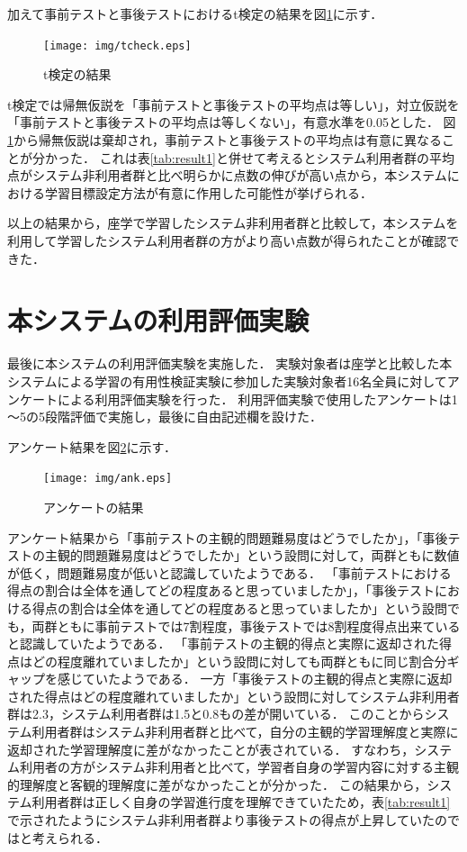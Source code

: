 加えて事前テストと事後テストにおけるt検定の結果を図\ref{fig:tcheck}に示す．
\begin{figure}[htbp]
\begin{center}
\texttt{[image: img/tcheck.eps]}
\end{center}
\caption{t検定の結果}
\label{fig:tcheck}
\end{figure}
t検定では帰無仮説を「事前テストと事後テストの平均点は等しい」，対立仮説を「事前テストと事後テストの平均点は等しくない」，有意水準を0.05とした．
図\ref{fig:tcheck}から帰無仮説は棄却され，事前テストと事後テストの平均点は有意に異なることが分かった．
これは表\ref{tab:result1}と併せて考えるとシステム利用者群の平均点がシステム非利用者群と比べ明らかに点数の伸びが高い点から，本システムにおける学習目標設定方法が有意に作用した可能性が挙げられる．

以上の結果から，座学で学習したシステム非利用者群と比較して，本システムを利用して学習したシステム利用者群の方がより高い点数が得られたことが確認できた．

\newpage

\section{本システムの利用評価実験}
最後に本システムの利用評価実験を実施した．
実験対象者は座学と比較した本システムによる学習の有用性検証実験に参加した実験対象者16名全員に対してアンケートによる利用評価実験を行った．
利用評価実験で使用したアンケートは1～5の5段階評価で実施し，最後に自由記述欄を設けた．

アンケート結果を図\ref{fig:ank}に示す．

\begin{figure}[htbp]
\begin{center}
\texttt{[image: img/ank.eps]}
\end{center}
\caption{アンケートの結果}
\label{fig:ank}
\end{figure}

アンケート結果から「事前テストの主観的問題難易度はどうでしたか」，「事後テストの主観的問題難易度はどうでしたか」という設問に対して，両群ともに数値が低く，問題難易度が低いと認識していたようである．
「事前テストにおける得点の割合は全体を通してどの程度あると思っていましたか」，「事後テストにおける得点の割合は全体を通してどの程度あると思っていましたか」という設問でも，両群ともに事前テストでは7割程度，事後テストでは8割程度得点出来ていると認識していたようである．
「事前テストの主観的得点と実際に返却された得点はどの程度離れていましたか」という設問に対しても両群ともに同じ割合分ギャップを感じていたようである．
一方「事後テストの主観的得点と実際に返却された得点はどの程度離れていましたか」という設問に対してシステム非利用者群は2.3，システム利用者群は1.5と0.8もの差が開いている．
このことからシステム利用者群はシステム非利用者群と比べて，自分の主観的学習理解度と実際に返却された学習理解度に差がなかったことが表されている．
すなわち，システム利用者の方がシステム非利用者と比べて，学習者自身の学習内容に対する主観的理解度と客観的理解度に差がなかったことが分かった．
この結果から，システム利用者群は正しく自身の学習進行度を理解できていたため，表\ref{tab:result1}で示されたようにシステム非利用者群より事後テストの得点が上昇していたのではと考えられる．

